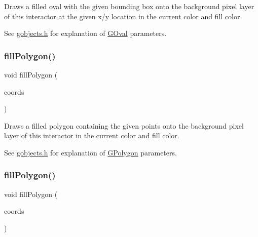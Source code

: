 Draws a filled oval with the given bounding box onto the background pixel layer of this interactor at the given x/y location in the current color and fill color. 

See \mbox{\hyperlink{gobjects_8h_source}{gobjects.\+h}} for explanation of \mbox{\hyperlink{classGOval}{G\+Oval}} parameters. \mbox{\label{classGDrawingSurface_a15f8c1c4409ef51c1a30a92a195b8f66}} 
\subsubsection{\texorpdfstring{fill\+Polygon()}{fillPolygon()}\hspace{0.1cm}{\footnotesize\ttfamily [1/2]}}
{\footnotesize\ttfamily void fill\+Polygon (\begin{DoxyParamCaption}\item[{std\+::initializer\+\_\+list$<$ double $>$}]{coords }\end{DoxyParamCaption})\hspace{0.3cm}{\ttfamily [virtual]}}



Draws a filled polygon containing the given points onto the background pixel layer of this interactor in the current color and fill color. 

See \mbox{\hyperlink{gobjects_8h_source}{gobjects.\+h}} for explanation of \mbox{\hyperlink{classGPolygon}{G\+Polygon}} parameters. \mbox{\label{classGDrawingSurface_a31822d59786156ebf1cc3b2f7fb70330}} 
\subsubsection{\texorpdfstring{fill\+Polygon()}{fillPolygon()}\hspace{0.1cm}{\footnotesize\ttfamily [2/2]}}
{\footnotesize\ttfamily void fill\+Polygon (\begin{DoxyParamCaption}\item[{std\+::initializer\+\_\+list$<$ \mbox{\hyperlink{structGPoint}{G\+Point}} $>$}]{coords }\end{DoxyParamCaption})\hspace{0.3cm}{\ttfamily [virtual]}}




